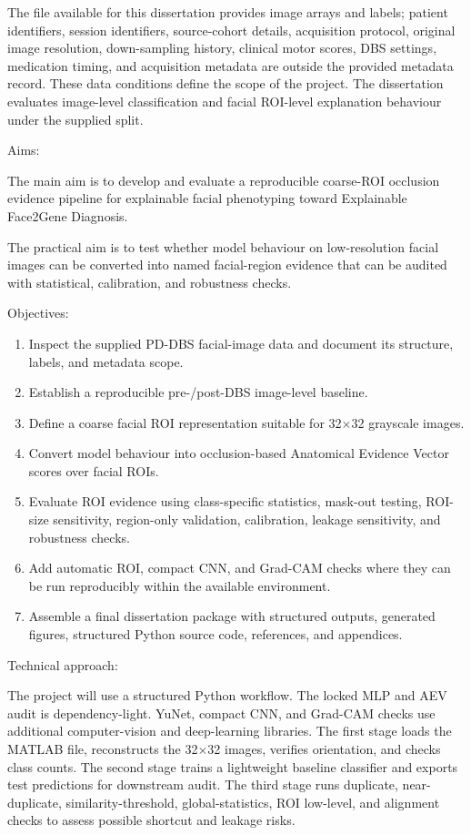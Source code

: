 The file available for this dissertation provides image arrays and labels; patient identifiers, session identifiers, source-cohort details, acquisition protocol, original image resolution, down-sampling history, clinical motor scores, DBS settings, medication timing, and acquisition metadata are outside the provided metadata record. These data conditions define the scope of the project. The dissertation evaluates image-level classification and facial ROI-level explanation behaviour under the supplied split.


Aims:


The main aim is to develop and evaluate a reproducible coarse-ROI occlusion evidence pipeline for explainable facial phenotyping toward Explainable Face2Gene Diagnosis.


The practical aim is to test whether model behaviour on low-resolution facial images can be converted into named facial-region evidence that can be audited with statistical, calibration, and robustness checks.


Objectives:


\begin{enumerate}
\item Inspect the supplied PD-DBS facial-image data and document its structure, labels, and metadata scope.
\item Establish a reproducible pre-/post-DBS image-level baseline.
\item Define a coarse facial ROI representation suitable for 32$\times$32 grayscale images.
\item Convert model behaviour into occlusion-based Anatomical Evidence Vector scores over facial ROIs.
\item Evaluate ROI evidence using class-specific statistics, mask-out testing, ROI-size sensitivity, region-only validation, calibration, leakage sensitivity, and robustness checks.
\item Add automatic ROI, compact CNN, and Grad-CAM checks where they can be run reproducibly within the available environment.
\item Assemble a final dissertation package with structured outputs, generated figures, structured Python source code, references, and appendices.
\end{enumerate}

Technical approach:


The project will use a structured Python workflow. The locked MLP and AEV audit is dependency-light. YuNet, compact CNN, and Grad-CAM checks use additional computer-vision and deep-learning libraries. The first stage loads the MATLAB file, reconstructs the 32$\times$32 images, verifies orientation, and checks class counts. The second stage trains a lightweight baseline classifier and exports test predictions for downstream audit. The third stage runs duplicate, near-duplicate, similarity-threshold, global-statistics, ROI low-level, and alignment checks to assess possible shortcut and leakage risks.


